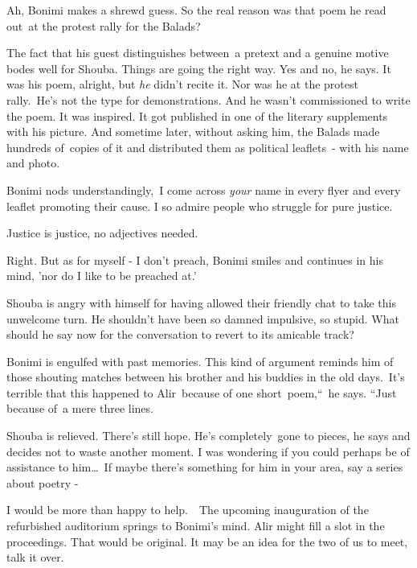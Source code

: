 \documentclass[letterpaper]{article}
\begin{document}
{\textquotedbl}Ah,{\textquotedbl} Bonimi makes a shrewd guess. {\textquotedbl}So the real reason was that poem he read
out~at the protest rally for the Balads?{\textquotedbl}

The fact that his guest distinguishes between~a pretext and a genuine motive bodes well for Shouba. Things are going the
right way. {\textquotedbl}Yes and no,{\textquotedbl} he says. {\textquotedbl}It was his poem, alright, but \textit{he}
didn't recite it. Nor was he at the protest rally.\ He's not the type for demonstrations. And he wasn't commissioned to
write the poem. It was inspired. It got published in one of the literary supplements with his picture. And sometime
later, without asking him, the Balads made hundreds of~copies of it and distributed them as political leaflets\ {}-
with his name and photo.{\textquotedbl} 

Bonimi nods understandingly,~{\textquotedbl}I come across \textit{your }name in every flyer and every leaflet promoting
their cause. I so admire people who struggle for pure justice.{\textquotedbl}

{\textquotedbl}Justice is justice, no adjectives needed.{\textquotedbl}

{\textquotedbl}Right. But as for myself - I don't preach,{\textquotedbl} Bonimi smiles and continues in his mind, {}'nor
do I like to be preached at.'

Shouba is angry with himself for having allowed their friendly chat to take this unwelcome turn. He shouldn't have been
so damned impulsive, so stupid. What should he say now for the conversation to revert to its amicable track?

Bonimi is engulfed with past memories. This kind of argument reminds him of those shouting matches between his brother
and his buddies in the old days.\ {\textquotedbl}It's terrible that this happened to Alir\ because of one
short\ poem,``\  he says. ``Just because of\textcolor{red}{\ }\textcolor{black}{a }mere three lines.{\textquotedbl}\ 

Shouba is relieved. There's still hope. {\textquotedbl}He's completely~gone to pieces,{\textquotedbl} he says and
decides not to waste another moment. {\textquotedbl}I was wondering if you could perhaps be of assistance to
him{\dots}\ If maybe there's something for him in your area, say a series about poetry -{\textquotedbl}\ 

{\textquotedbl}I would be more than happy to help.{\textquotedbl}\ \ The upcoming inauguration of the refurbished
auditorium springs to Bonimi's mind. Alir might fill a slot in the proceedings. That would be original.
{\textquotedbl}It may be an idea for the two of us to meet, talk it over.{\textquotedbl}
\end{document}
